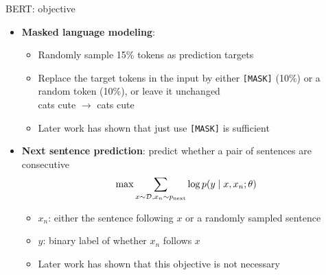 \documentclass[usenames,dvipsnames,notes,11pt,aspectratio=169,hyperref={colorlinks=true, linkcolor=blue}]{beamer}
\begin{document}
\begin{frame}
    {BERT: objective}

        \begin{itemize}
            \item \textbf{Masked language modeling}:
                \begin{itemize}
                    \item Randomly sample 15\% tokens as prediction targets
                    \item Replace the target tokens in the input by either \texttt{[MASK]} (10\%) or a random token (10\%), or leave it unchanged\\
                        cats  cute $\rightarrow$
                        cats  cute
                        
                    \item Later work has shown that just use \texttt{[MASK]} is sufficient
                \end{itemize}
            \pause
            \item \textbf{Next sentence prediction}: predict whether a pair of sentences are consecutive
                $$
                \max \sum_{x\sim\mathcal{D}, x_{n}\sim p_{\text{next}}} \log p(y\mid x, x_n; \theta)
                $$
                \vspace{-1em}
                \begin{itemize}
                    \item $x_n$: either the sentence following $x$ or a randomly sampled sentence
                    \item $y$: binary label of whether $x_n$ follows $x$
                    \item Later work has shown that this objective is not necessary 
                \end{itemize}
        \end{itemize}
\end{frame}
\end{document}
